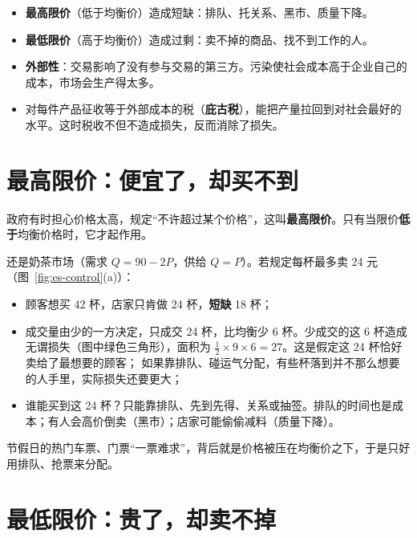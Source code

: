 
\begin{keypoints}
\begin{itemize}
  \item \textbf{最高限价}（低于均衡价）造成短缺：排队、托关系、黑市、质量下降。
  \item \textbf{最低限价}（高于均衡价）造成过剩：卖不掉的商品、找不到工作的人。
  \item \textbf{外部性}：交易影响了没有参与交易的第三方。污染使社会成本高于企业自己的成本，市场会生产得太多。
  \item 对每件产品征收等于外部成本的税（\textbf{庇古税}），能把产量拉回到对社会最好的水平。这时税收不但不造成损失，反而消除了损失。
\end{itemize}
\end{keypoints}

\section{最高限价：便宜了，却买不到}

政府有时担心价格太高，规定“不许超过某个价格”，这叫\textbf{最高限价}。只有当限价\textbf{低于}均衡价格时，它才起作用。

还是奶茶市场（需求 $Q=90-2P$，供给 $Q=P$）。若规定每杯最多卖 24 元（图~\ref{fig:es-control}(a)）：
\begin{itemize}
  \item 顾客想买 42 杯，店家只肯做 24 杯，\textbf{短缺} 18 杯；
  \item 成交量由少的一方决定，只成交 24 杯，比均衡少 6 杯。少成交的这 6 杯造成无谓损失（图中绿色三角形），面积为 $\frac12\times9\times6=27$。这是假定这 24 杯恰好卖给了最想要的顾客；
        如果靠排队、碰运气分配，有些杯落到并不那么想要的人手里，实际损失还要更大；
  \item 谁能买到这 24 杯？只能靠排队、先到先得、关系或抽签。排队的时间也是成本；有人会高价倒卖（黑市）；店家可能偷偷减料（质量下降）。
\end{itemize}
节假日的热门车票、门票“一票难求”，背后就是价格被压在均衡价之下，于是只好用排队、抢票来分配。

\section{最低限价：贵了，却卖不掉}

